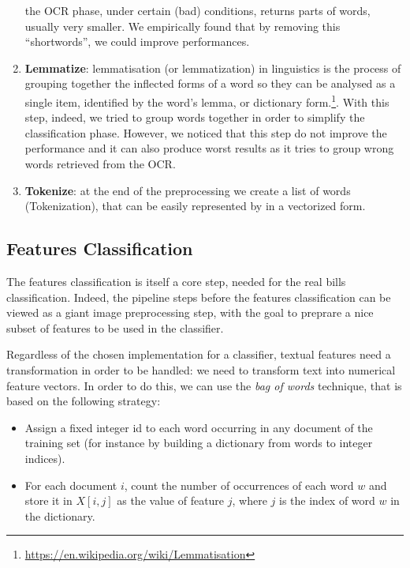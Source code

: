 \documentclass[10pt,twocolumn,letterpaper]{article}
\begin{document}
\begin{enumerate}
    the OCR phase, under certain (bad) conditions, returns parts of
    words, usually very smaller. We empirically found that by removing
    this ``shortwords'', we could improve performances.
  \item \textbf{Lemmatize}: lemmatisation (or lemmatization) in linguistics is
    the process of grouping together the inflected forms of a word so
    they can be analysed as a single item, identified by the word's
    lemma, or dictionary form.\footnote{\href{
        https://en.wikipedia.org/wiki/Lemmatisation}{
        https://en.wikipedia.org/wiki/Lemmatisation}}. With
    this step, indeed, we tried to group words together in order to
    simplify the classification phase. However, we noticed that this
    step do not improve the performance and it can also produce worst
    results as it tries to group wrong words retrieved from the OCR.
  \item \textbf{Tokenize}: at the end of the preprocessing we create a list of
    words (Tokenization), that can be easily represented by in a
    vectorized form.
\end{enumerate}

\subsection{Features Classification}
\label{subsec:classification}

The features classification is itself a core step, needed for the real
bills classification. Indeed, the pipeline steps before the features
classification can be viewed as a giant image preprocessing step, with
the goal to preprare a nice subset of features to be used in the
classifier.

Regardless of the chosen implementation for a classifier, textual
features need a transformation in order to be handled: we need to
transform text into numerical feature vectors. In order to do this, we
can use the \emph{bag of words} technique, that is based on the
following strategy:

\begin{itemize}
  \item Assign a fixed integer id to each word occurring in any
    document of the training set (for instance by building a
    dictionary from words to integer indices).
  \item For each document $i$, count the number of occurrences of each
    word $w$ and store it in $X[i, j]$ as the value of feature $j$,
    where $j$ is the index of word $w$ in the dictionary.
\end{itemize}
\end{document}
